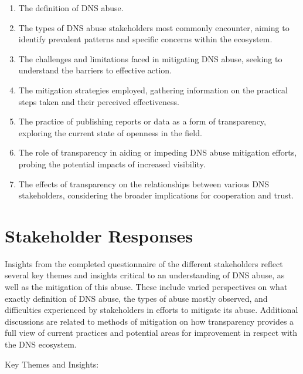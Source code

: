  \begin{enumerate}
 \item The definition of DNS abuse. 
  \item The types of DNS abuse stakeholders most commonly encounter, aiming to identify prevalent patterns and specific concerns within the ecosystem.
  
  \item The challenges and limitations faced in mitigating DNS abuse, seeking to understand the barriers to effective action.
  
  \item The mitigation strategies employed, gathering information on the practical steps taken and their perceived effectiveness.
  
  \item The practice of publishing reports or data as a form of transparency, exploring the current state of openness in the field.
  
  \item The role of transparency in aiding or impeding DNS abuse mitigation efforts, probing the potential impacts of increased visibility.
  
  \item  The effects of transparency on the relationships between various DNS stakeholders, considering the broader implications for cooperation and trust.
\end{enumerate}


\section{Stakeholder Responses} 

Insights from the completed questionnaire of the different stakeholders reflect several key themes and insights critical to an understanding of DNS abuse, as well as the mitigation of this abuse. These include varied perspectives on what exactly definition of DNS abuse, the types of abuse mostly observed, and difficulties experienced by stakeholders in efforts to mitigate its abuse. Additional discussions are related to methods of mitigation on how transparency provides a full view of current practices and potential areas for improvement in respect with the DNS ecosystem.

Key Themes and Insights:

